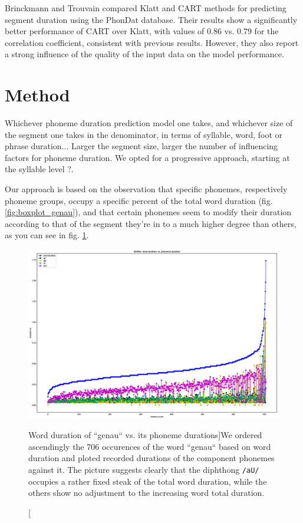 \documentclass[a4paper]{scrreprt}
\begin{document}
Brinckmann and Trouvain \cite{Brinckmann_2003} compared Klatt and CART methods for predicting segment duration using the PhonDat database. Their results show a significantly better performance of CART over Klatt, with values of 0.86 vs. 0.79 for the correlation coefficient, consistent with previous results. However, they also report a strong influence of  the quality of the input data on the model performance.

\section{Method}
Whichever phoneme duration prediction model one takes, and whichever size of the segment one takes in the denominator, in terms of syllable, word, foot or phrase duration... Larger the segment size, larger the number of influencing factors for phoneme duration. We opted for a progressive approach, starting at the syllable level ?.

Our approach is based on the observation that specific phonemes, respectively phoneme groups, occupy a specific percent of the total word duration (fig. \ref{fig:boxplot_genau}), and that certain phonemes seem to modify their duration according to that of the segment they're in to a much higher degree than others, as you can see in fig. \ref{fig:w_dur_vs_pho}.

\begin{figure}[htbp]
	\includegraphics[width=\textwidth]{../Graphen/Stats_for_genau.eps}
	\centering
	\caption[Word duration of ``genau`` vs. its phoneme durations]{We ordered ascendingly the 706 occurences of the word ``genau`` based on word duration and ploted recorded durations of the component phonemes against it. The picture suggests clearly that the diphthong \texttt{/aU/} occupies a rather fixed steak of the total word duration, while the others show no adjustment to the increasing word total duration. }
	\label{fig:w_dur_vs_pho}
\end{figure}
\end{document}
